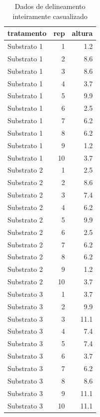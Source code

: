 \documentclass[
]{article}
\begin{document}
\begin{table}

\caption{\label{tab:unnamed-chunk-47}Dados de delineamento inteiramente casualizado}
\centering
\begin{tabular}[t]{l|r|r}
\hline
tratamento & rep & altura\\
\hline
Substrato 1 & 1 & 1.2\\
\hline
Substrato 1 & 2 & 8.6\\
\hline
Substrato 1 & 3 & 8.6\\
\hline
Substrato 1 & 4 & 3.7\\
\hline
Substrato 1 & 5 & 9.9\\
\hline
Substrato 1 & 6 & 2.5\\
\hline
Substrato 1 & 7 & 6.2\\
\hline
Substrato 1 & 8 & 6.2\\
\hline
Substrato 1 & 9 & 1.2\\
\hline
Substrato 1 & 10 & 3.7\\
\hline
Substrato 2 & 1 & 2.5\\
\hline
Substrato 2 & 2 & 8.6\\
\hline
Substrato 2 & 3 & 7.4\\
\hline
Substrato 2 & 4 & 6.2\\
\hline
Substrato 2 & 5 & 9.9\\
\hline
Substrato 2 & 6 & 2.5\\
\hline
Substrato 2 & 7 & 6.2\\
\hline
Substrato 2 & 8 & 6.2\\
\hline
Substrato 2 & 9 & 1.2\\
\hline
Substrato 2 & 10 & 3.7\\
\hline
Substrato 3 & 1 & 3.7\\
\hline
Substrato 3 & 2 & 9.9\\
\hline
Substrato 3 & 3 & 11.1\\
\hline
Substrato 3 & 4 & 7.4\\
\hline
Substrato 3 & 5 & 7.4\\
\hline
Substrato 3 & 6 & 3.7\\
\hline
Substrato 3 & 7 & 6.2\\
\hline
Substrato 3 & 8 & 8.6\\
\hline
Substrato 3 & 9 & 11.1\\
\hline
Substrato 3 & 10 & 11.1\\
\hline
\end{tabular}
\end{table}
\end{document}
